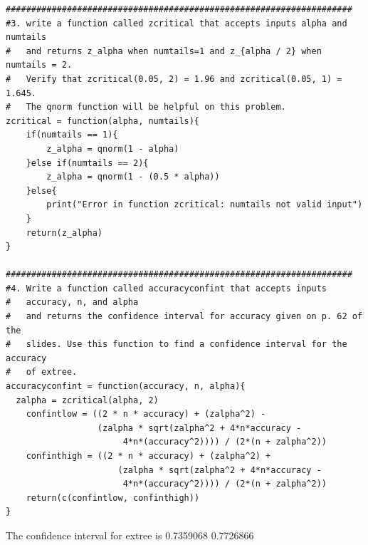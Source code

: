\documentclass[11pt]{article}
\begin{document}
\begin{Verbatim}
####################################################################
#3. write a function called zcritical that accepts inputs alpha and numtails
#   and returns z_alpha when numtails=1 and z_{alpha / 2} when numtails = 2.
#   Verify that zcritical(0.05, 2) = 1.96 and zcritical(0.05, 1) = 1.645. 
#   The qnorm function will be helpful on this problem. 
zcritical = function(alpha, numtails){
    if(numtails == 1){
    	z_alpha = qnorm(1 - alpha)
    }else if(numtails == 2){
    	z_alpha = qnorm(1 - (0.5 * alpha))
    }else{
    	print("Error in function zcritical: numtails not valid input")
    }
	return(z_alpha)
}

####################################################################
#4. Write a function called accuracyconfint that accepts inputs 
#   accuracy, n, and alpha
#   and returns the confidence interval for accuracy given on p. 62 of the 
#   slides. Use this function to find a confidence interval for the accuracy 
#   of extree.
accuracyconfint = function(accuracy, n, alpha){
  zalpha = zcritical(alpha, 2)
	confintlow = ((2 * n * accuracy) + (zalpha^2) - 
	              (zalpha * sqrt(zalpha^2 + 4*n*accuracy - 
                       4*n*(accuracy^2)))) / (2*(n + zalpha^2))
	confinthigh = ((2 * n * accuracy) + (zalpha^2) + 
                      (zalpha * sqrt(zalpha^2 + 4*n*accuracy - 
                       4*n*(accuracy^2)))) / (2*(n + zalpha^2))
    return(c(confintlow, confinthigh))
}
\end{Verbatim}

The confidence interval for extree is 
0.7359068 0.7726866
\end{document}
